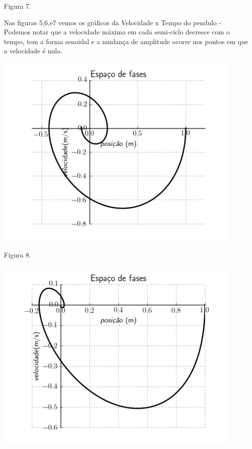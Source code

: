 \documentclass[a4paper]{article} %
\begin{document}
\begin{center}
	\scriptsize  Figura 7. 
	
\end{center}

Nas figuras 5,6,e7 vemos os gr\'aficos da Velocidade x Tempo do pendulo - Podemos notar que a velocidade m\'axima em cada semi-ciclo decresce com o tempo, tem a forma senoidal e a mudan\c{c}a de amplitude ocorre nos pontos em que a velocidade \'e nula.
 
\begin{center}
	
	\includegraphics[width=4.80in,height=3.84in,keepaspectratio = false]{pendulo1_image3.png}
	
	\scriptsize  Figura 8. 
	
	\includegraphics[width=4.80in,height=3.84in,keepaspectratio = false]{pendulo2_image3.png}
	

\end{center}
\end{document}
